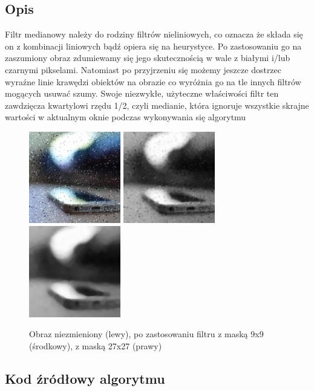 \documentclass[a4paper,12pt]{book}
\begin{document}
		\subsection{Opis}
			Filtr medianowy należy do rodziny filtrów nieliniowych, co oznacza że składa się on z kombinacji liniowych bądź opiera się na heurystyce. Po zastosowaniu go na zaszumiony obraz zdumiewamy się jego skutecznością w wale z białymi i/lub czarnymi pikselami. Natomiast po przyjrzeniu się możemy jeszcze dostrzec wyraźne linie krawędzi obiektów na obrazie co wyróżnia go na tle innych filtrów mogących usuwać szumy. Swoje niezwykłe, użyteczne właściwości filtr ten zawdzięcza kwartylowi rzędu 1/2, czyli medianie, która ignoruje wszystkie skrajne wartości w aktualnym oknie podczas wykonywania się algorytmu
			\begin{figure}[H]
				\caption{Obraz niezmieniony (lewy), po zastosowaniu filtru z maską 9x9 (środkowy), z maską 27x27 (prawy)}
				\includegraphics[width=4cm, height=4cm]{phone-noise-unmodified.jpg}
				\includegraphics[width=4cm, height=4cm]{phone-filter-median9x9.png}
				\includegraphics[width=4cm, height=4cm]{phone-filter-median27x27.png}
			\end{figure}
		\subsection{Kod źródłowy algorytmu}
\end{document}
